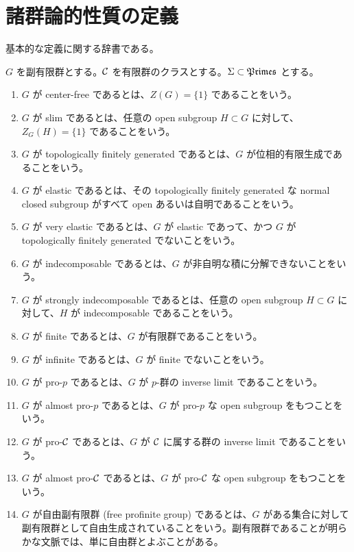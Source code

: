 \section{諸群論的性質の定義}\label{group-theoretic-properties}

基本的な定義に関する辞書である。

\begin{defn}\label{0001}
  $G$ を副有限群とする。$\mathcal{C}$ を有限群のクラスとする。$\Sigma \subset \mathfrak{Primes}$ とする。
  \begin{enumerate}
    \item $G$ が center-free であるとは、$Z(G) = \{1\}$ であることをいう。
    \item $G$ が slim であるとは、任意の open subgroup $H \subset G$ に対して、$Z_G(H) = \{1\}$ であることをいう。
    \item $G$ が topologically finitely generated であるとは、$G$ が位相的有限生成であることをいう。
    \item $G$ が elastic であるとは、その topologically finitely generated な normal closed subgroup がすべて open あるいは自明であることをいう。
    \item $G$ が very elastic であるとは、$G$ が elastic であって、かつ $G$ が topologically finitely generated でないことをいう。
    \item $G$ が indecomposable であるとは、$G$ が非自明な積に分解できないことをいう。
    \item $G$ が strongly indecomposable であるとは、任意の open subgroup $H \subset G$ に対して、$H$ が indecomposable であることをいう。
    \item $G$ が finite であるとは、$G$ が有限群であることをいう。
    \item $G$ が infinite であるとは、$G$ が finite でないことをいう。
    \item $G$ が pro-$p$ であるとは、$G$ が $p$-群の inverse limit であることをいう。
    \item $G$ が almost pro-$p$ であるとは、$G$ が pro-$p$ な open subgroup をもつことをいう。
    \item $G$ が pro-$\mathcal{C}$ であるとは、$G$ が $\mathcal{C}$ に属する群の inverse limit であることをいう。
    \item $G$ が almost pro-$\mathcal{C}$ であるとは、$G$ が pro-$\mathcal{C}$ な open subgroup をもつことをいう。
    \item $G$ が自由副有限群 (free profinite group) であるとは、$G$ がある集合に対して副有限群として自由生成されていることをいう。副有限群であることが明らかな文脈では、単に自由群とよぶことがある。

\end{enumerate}
\end{defn}

